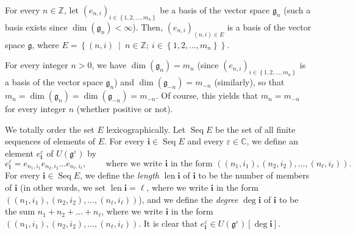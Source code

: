 \documentclass[etingof-lie.tex]{subfiles}
\begin{document}
\begin{Convention}
\label{conv.invformnondeg.bases}For every $n\in\mathbb{Z}$, let $\left(
e_{n,i}\right)  _{i\in\left\{  1,2,...,m_{n}\right\}  }$ be a basis of the
vector space $\mathfrak{g}_{n}$ (such a basis exists since $\dim\left(
\mathfrak{g}_{n}\right)  <\infty$). Then, $\left(  e_{n,i}\right)  _{\left(
n,i\right)  \in E}$ is a basis of the vector space $\mathfrak{g}$, where
$E=\left\{  \left(  n,i\right)  \ \mid\ n\in\mathbb{Z};\ i\in\left\{
1,2,...,m_{n}\right\}  \right\}  $.

For every integer $n>0$, we have $\dim\left(  \mathfrak{g}_{n}\right)  =m_{n}$
(since $\left(  e_{n,i}\right)  _{i\in\left\{  1,2,...,m_{n}\right\}  }$ is a
basis of the vector space $\mathfrak{g}_{n}$) and $\dim\left(  \mathfrak{g}%
_{-n}\right)  =m_{-n}$ (similarly), so that $m_{n}=\dim\left(  \mathfrak{g}%
_{n}\right)  =\dim\left(  \mathfrak{g}_{-n}\right)  =m_{-n}$. Of course, this
yields that $m_{n}=m_{-n}$ for every integer $n$ (whether positive or not).

We totally order the set $E$ lexicographically. Let $\operatorname*{Seq}E$ be
the set of all finite sequences of elements of $E$. For every $\mathbf{i}%
\in\operatorname*{Seq}E$ and every $\varepsilon\in\mathbb{C}$, we define an
element $e_{\mathbf{i}}^{\varepsilon}$ of $U\left(  \mathfrak{g}^{\varepsilon
}\right)  $ by%
\[
e_{\mathbf{i}}^{\varepsilon}=e_{n_{1},i_{1}}e_{n_{2},i_{2}}...e_{n_{\ell
},i_{\ell}},\ \ \ \ \ \ \ \ \ \ \text{where we write }\mathbf{i}\text{ in the
form }\left(  \left(  n_{1},i_{1}\right)  ,\left(  n_{2},i_{2}\right)
,...,\left(  n_{\ell},i_{\ell}\right)  \right)  .
\]
For every $\mathbf{i}\in\operatorname*{Seq}E$, we define the \textit{length}
$\operatorname*{len}\mathbf{i}$ of $\mathbf{i}$ to be the number of members of
$\mathbf{i}$ (in other words, we set $\operatorname*{len}\mathbf{i}=\ell$,
where we write $\mathbf{i}$ in the form $\left(  \left(  n_{1},i_{1}\right)
,\left(  n_{2},i_{2}\right)  ,...,\left(  n_{\ell},i_{\ell}\right)  \right)
$), and we define the \textit{degree} $\deg\mathbf{i}$ of $\mathbf{i}$ to be
the sum $n_{1}+n_{2}+...+n_{\ell}$, where we write $\mathbf{i}$ in the form
$\left(  \left(  n_{1},i_{1}\right)  ,\left(  n_{2},i_{2}\right)  ,...,\left(
n_{\ell},i_{\ell}\right)  \right)  $. It is clear that $e_{\mathbf{i}%
}^{\varepsilon}\in U\left(  \mathfrak{g}^{\varepsilon}\right)  \left[
\deg\mathbf{i}\right]  $.


\end{Convention}
\end{document}
